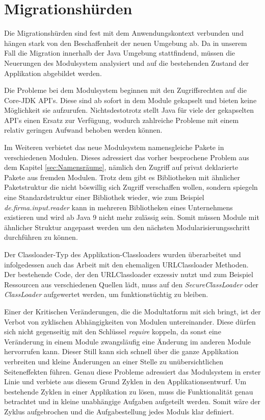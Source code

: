 \section{Migrationshürden}
Die Migrationshürden sind fest mit dem Anwendungskontext verbunden und hängen stark von den Beschaffenheit der neuen Umgebung ab. Da in unserem Fall die Migration innerhalb der Java Umgebung stattfindend, müssen die Neuerungen des Modulsystem analysiert und auf die bestehenden Zustand der Applikation abgebildet werden.\bigbreak

Die Probleme bei dem Modulsystem beginnen mit den Zugriffsrechten auf die Core-JDK API's. Diese sind ab sofort in dem Module gekapselt und bieten keine Möglichkeit sie aufzurufen. Nichtsdestotrotz stellt Java für viele der gekapselten API's einen Ersatz zur Verfügung, wodurch zahlreiche Probleme mit einem relativ geringen Aufwand behoben werden können. 


Im Weiteren verbietet das neue Modulsystem namensgleiche Pakete in verschiedenen Modulen. Dieses adressiert das vorher besprochene Problem aus dem Kapitel \ref{sec:Namensräume}, nämlich den Zugriff auf privat deklarierte Pakete aus fremden Modulen. Trotz dem gibt es Bibliotheken mit ähnlicher Paketstruktur die nicht böswillig sich Zugriff verschaffen wollen, sondern spiegeln eine Standardstruktur einer Bibliothek wieder, wie zum Beispiel \textit{de.firma.input.reader} kann in mehreren Bibliotheken eines Unternehmens existieren und wird ab Java 9 nicht mehr zulässig sein. Somit müssen Module mit ähnlicher Struktur angepasst werden um den nächsten Modularisierungsschritt durchführen zu können.


Der Classloader-Typ des Applikation-Classloaders wurden überarbeitet und infolgedessen auch das Arbeit mit den ehemaligen URLClassloader Methoden. Der bestehende Code, der den URLClassloader exzessiv nutzt und zum Beispiel Ressourcen aus verschiedenen Quellen lädt, muss auf den \textit{SecureClassLoader} oder  \textit{ClassLoader} aufgewertet werden, um funktionstüchtig zu bleiben. 


Einer der Kritischen Veränderungen, die die Modultatform mit sich bringt, ist der Verbot von zyklischen Abhängigkeiten von Modulen untereinander. Diese dürfen sich nicht gegenseitig mit den Schlüssel \textit{require} koppeln, da sonst eine Veränderung in einem Module zwangsläufig eine Änderung im anderen Module hervorrufen kann. Dieser Still kann sich schnell über die ganze Applikation verbreiten und kleine Änderungen an einer Stelle zu unübersichtlichen Seiteneffekten führen. Genau diese Probleme adressiert das Modulsystem in erster Linie und verbiete aus diesem Grund Zyklen in den Applikationsentwurf. Um bestehende Zyklen in einer Applikation zu lösen, muss die Funktionalität genau betrachtet und in kleine unabhängige Aufgaben aufgeteilt werden. Somit wäre der Zyklus aufgebrochen und die Aufgabestellung jedes Moduls klar definiert. \bigbreak

